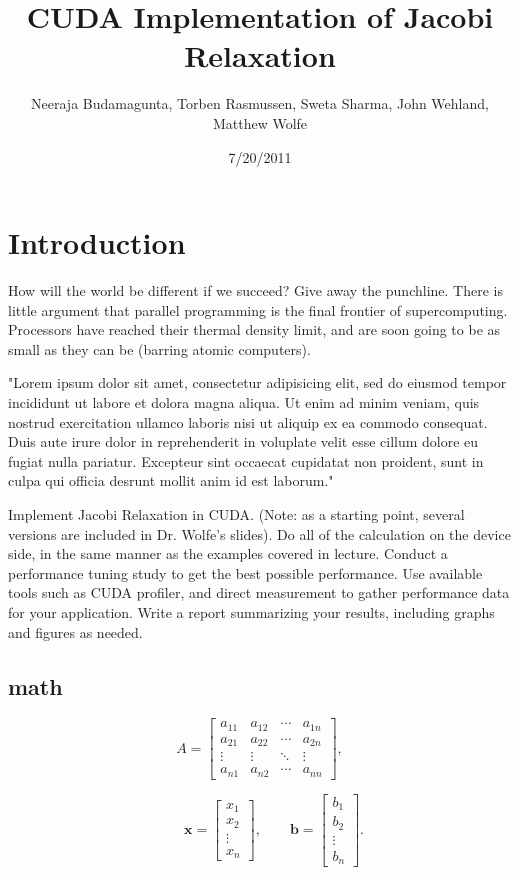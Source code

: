 \documentclass[11pt, twocolumn]{article}
\title{CUDA Implementation of Jacobi Relaxation}
\author{Neeraja Budamagunta, Torben Rasmussen, Sweta Sharma, John Wehland, Matthew Wolfe}
\date{7/20/2011}
\begin{document}
\maketitle

\section{Introduction} %
How will the world be different if we succeed?
Give away the punchline\cite{keyname1}.
There is little argument that parallel programming is the final frontier of supercomputing.
Processors have reached their thermal density limit, and are soon going to be as small as they can be (barring atomic computers).

"Lorem ipsum dolor sit amet, consectetur adipisicing elit, sed do eiusmod tempor incididunt ut labore et dolora magna aliqua.  Ut enim ad minim veniam, quis nostrud exercitation ullamco laboris nisi ut aliquip ex ea commodo consequat.  Duis aute irure dolor in reprehenderit in voluplate velit esse cillum dolore eu fugiat nulla pariatur.  Excepteur sint occaecat cupidatat non proident, sunt in culpa qui officia desrunt mollit anim id est laborum."

Implement Jacobi Relaxation in CUDA.
(Note: as a starting point, several versions are included in Dr. Wolfe's slides).
Do all of the calculation on the device side, in the same manner as the examples covered in lecture.
Conduct a performance tuning study to get the best possible performance.
Use available tools such as CUDA profiler, and direct measurement to gather performance data for your application.
Write a report summarizing your results, including graphs and figures as needed.

\subsection{math} 
\begin{equation}
A=\begin{bmatrix} a_{11} & a_{12} & \cdots & a_{1n} \\ a_{21} & a_{22} & \cdots & a_{2n} \\ \vdots & \vdots & \ddots & \vdots \\a_{n1} & a_{n2} & \cdots & a_{nn} \end{bmatrix}, 
\end{equation}

\begin{equation}
\qquad  \mathbf{x} = \begin{bmatrix} x_{1} \\ x_2 \\ \vdots \\ x_n \end{bmatrix},
\qquad  \mathbf{b} = \begin{bmatrix} b_{1} \\ b_2 \\ \vdots \\ b_n \end{bmatrix}.
\end{equation}
\end{document}
